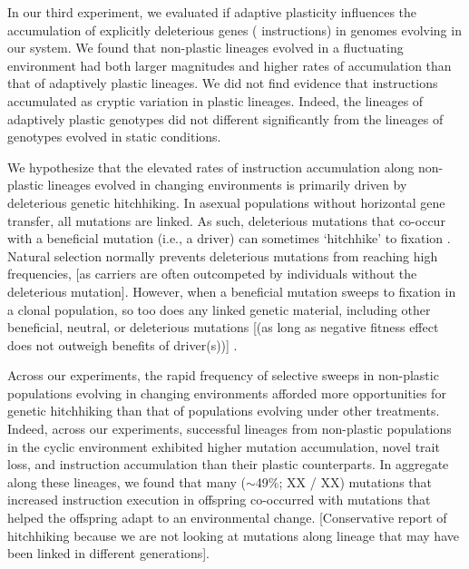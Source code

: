 In our third experiment, we evaluated if adaptive plasticity influences the accumulation of explicitly deleterious genes ( instructions) in genomes evolving in our system.
We found that non-plastic lineages evolved in a fluctuating environment had both larger magnitudes and higher rates of  accumulation than that of adaptively plastic lineages.
We did not find evidence that  instructions accumulated as cryptic variation in plastic lineages.
Indeed, the lineages of adaptively plastic genotypes did not different significantly from the lineages of genotypes evolved in static conditions.

We hypothesize that the elevated rates of  instruction accumulation along non-plastic lineages evolved in changing environments is primarily driven by deleterious genetic hitchhiking.
In asexual populations without horizontal gene transfer, all mutations are linked.
As such, deleterious mutations that co-occur with a beneficial mutation (i.e., a driver) can sometimes `hitchhike' to fixation \citep{smith_hitch-hiking_1974,van_den_bergh_experimental_2018,buskirk_hitchhiking_2017}.
Natural selection normally prevents deleterious mutations from reaching high frequencies, [as carriers are often outcompeted by individuals without the deleterious mutation]. 
However, when a beneficial mutation sweeps to fixation in a clonal population, so too does any linked genetic material, including other beneficial, neutral, or deleterious mutations [(as long as negative fitness effect does not outweigh benefits of driver(s))] \cite{barton_genetic_2000, smith_hitch-hiking_1974}.

Across our experiments, the rapid frequency of selective sweeps in non-plastic populations evolving in changing environments afforded more opportunities for genetic hitchhiking than that of populations evolving under other treatments. 
Indeed, across our experiments, successful lineages from non-plastic populations in the cyclic environment exhibited higher mutation accumulation, novel trait loss, and  instruction accumulation than their plastic counterparts.
In aggregate along these lineages, we found that many ($\sim$49\%; XX / XX) mutations that increased  instruction execution in offspring co-occurred with mutations that helped the offspring adapt to an environmental change.
[Conservative report of hitchhiking because we are not looking at mutations along lineage that may have been linked in different generations].

